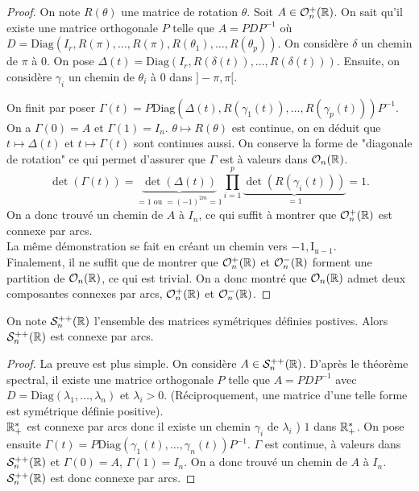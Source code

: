 \documentclass[../main.tex]{subfiles}
\begin{document}
\begin{proof} On note \(R(\theta)\) une matrice de rotation \(\theta\).
    Soit \(A\in \mathcal{O}_n^+(\mathbb{R})\). On sait qu'il existe une matrice orthogonale \(P\)
    telle que \(A = PDP^{-1}\) où \(D = \mathrm{Diag}(I_r,R(\pi),\ldots,R(\pi),R(\theta_1),\ldots,R(\theta_p))\).
    On considère \(\delta\) un chemin de \(\pi\) à \(0\). On pose \(\Delta(t) = \mathrm{Diag}(I_r,R(\delta(t)),\ldots,R(\delta(t)))\).
    Ensuite, on considère \(\gamma_{i}\) un chemin de \(\theta_i\) à \(0\) dans \(]-\pi,\pi[\).

    On finit par poser \(\Gamma(t) = P\mathrm{Diag}(\Delta(t),R(\gamma_1(t)),\ldots,R(\gamma_p(t)))P^{-1}\).
    On a \(\Gamma(0) = A\) et \(\Gamma(1)=I_n\). \(\theta\mapsto R(\theta)\) est continue, on en déduit que \(t\mapsto \Delta(t)\) et \(t\mapsto \Gamma(t)\) sont continues aussi.
    On conserve la forme de "diagonale de rotation" ce qui permet d'assurer que \(\Gamma\) est à valeurs dans \(\mathcal{O}_n(\mathbb{R})\).
    \begin{equation}
        \det(\Gamma(t)) = \underbrace{\det(\Delta(t))}_{=1\text{ ou } =(-1)^{2m}=1}\prod_{i=1}^p \underbrace{\det(R(\gamma_i(t)))}_{=1} = 1.
    \end{equation}
    On a donc trouvé un chemin de \(A\) à \(I_n\), ce qui suffit à montrer que \(\mathcal{O}_n^+(\mathbb{R})\) est connexe par arcs.\\

    La même démonstration se fait en créant un chemin vers \(\mathrm{-1,I_{n-1}}\).\\

    Finalement, il ne suffit que de montrer que \(\mathcal{O}_n^+(\mathbb{R})\) et \(\mathcal{O}_n^-(\mathbb{R})\) forment une partition de \(\mathcal{O}_n(\mathbb{R})\), ce qui est trivial.
    On a donc montré que \(\mathcal{O}_n(\mathbb{R})\) admet deux composantes connexes par arcs, \(\mathcal{O}_n^+(\mathbb{R})\) et \(\mathcal{O}_n^-(\mathbb{R})\).
\end{proof}
\begin{lemma} On note \(\mathcal{S}^{++}_n(\mathbb{R})\) l'ensemble des matrices symétriques définies
    postives. Alors \(\mathcal{S}^{++}_n(\mathbb{R})\) est connexe par arcs.
\end{lemma}
\begin{proof} La preuve est plus simple. On considère \(A\in \mathcal{S}_n^{++}(\mathbb{R})\).
    D'après le théorème spectral, il existe une matrice orthogonale \(P\) telle que
    \(A = PDP^{-1}\) avec \(D = \mathrm{Diag}(\lambda_1,\ldots,\lambda_n)\) et \(\lambda_i > 0\).
    (Réciproquement, une matrice d'une telle forme est symétrique définie positive).\\
    \(\mathbb{R}^*_+\) est connexe par arcs donc il existe un chemin \(\gamma_i\) de \(\lambda_i\) ) \(1\) dans \(\mathbb{R}^*_+\).
    On pose ensuite \(\Gamma(t) = P\mathrm{Diag}(\gamma_1(t),\ldots,\gamma_n(t))P^{-1}\).
    \(\Gamma\) est continue, à valeurs dans \(\mathcal{S}_n^{++}(\mathbb{R})\) et \(\Gamma(0) = A\), \(\Gamma(1) = I_n\).
    On a donc trouvé un chemin de \(A\) à \(I_n\). \(\mathcal{S}_n^{++}(\mathbb{R})\) est donc connexe par arcs.
\end{proof}
\end{document}
